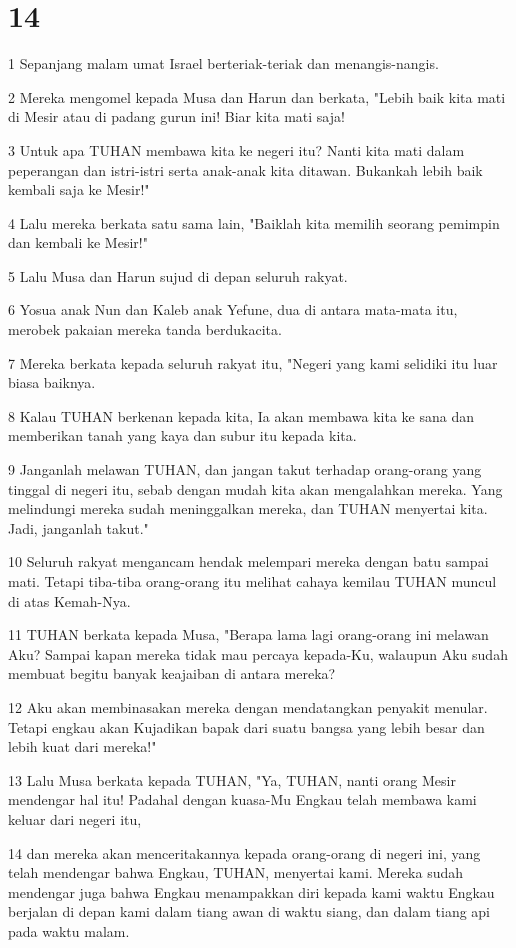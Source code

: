 \chapter{14}

\par 1 Sepanjang malam umat Israel berteriak-teriak dan menangis-nangis.
\par 2 Mereka mengomel kepada Musa dan Harun dan berkata, "Lebih baik kita mati di Mesir atau di padang gurun ini! Biar kita mati saja!
\par 3 Untuk apa TUHAN membawa kita ke negeri itu? Nanti kita mati dalam peperangan dan istri-istri serta anak-anak kita ditawan. Bukankah lebih baik kembali saja ke Mesir!"
\par 4 Lalu mereka berkata satu sama lain, "Baiklah kita memilih seorang pemimpin dan kembali ke Mesir!"
\par 5 Lalu Musa dan Harun sujud di depan seluruh rakyat.
\par 6 Yosua anak Nun dan Kaleb anak Yefune, dua di antara mata-mata itu, merobek pakaian mereka tanda berdukacita.
\par 7 Mereka berkata kepada seluruh rakyat itu, "Negeri yang kami selidiki itu luar biasa baiknya.
\par 8 Kalau TUHAN berkenan kepada kita, Ia akan membawa kita ke sana dan memberikan tanah yang kaya dan subur itu kepada kita.
\par 9 Janganlah melawan TUHAN, dan jangan takut terhadap orang-orang yang tinggal di negeri itu, sebab dengan mudah kita akan mengalahkan mereka. Yang melindungi mereka sudah meninggalkan mereka, dan TUHAN menyertai kita. Jadi, janganlah takut."
\par 10 Seluruh rakyat mengancam hendak melempari mereka dengan batu sampai mati. Tetapi tiba-tiba orang-orang itu melihat cahaya kemilau TUHAN muncul di atas Kemah-Nya.
\par 11 TUHAN berkata kepada Musa, "Berapa lama lagi orang-orang ini melawan Aku? Sampai kapan mereka tidak mau percaya kepada-Ku, walaupun Aku sudah membuat begitu banyak keajaiban di antara mereka?
\par 12 Aku akan membinasakan mereka dengan mendatangkan penyakit menular. Tetapi engkau akan Kujadikan bapak dari suatu bangsa yang lebih besar dan lebih kuat dari mereka!"
\par 13 Lalu Musa berkata kepada TUHAN, "Ya, TUHAN, nanti orang Mesir mendengar hal itu! Padahal dengan kuasa-Mu Engkau telah membawa kami keluar dari negeri itu,
\par 14 dan mereka akan menceritakannya kepada orang-orang di negeri ini, yang telah mendengar bahwa Engkau, TUHAN, menyertai kami. Mereka sudah mendengar juga bahwa Engkau menampakkan diri kepada kami waktu Engkau berjalan di depan kami dalam tiang awan di waktu siang, dan dalam tiang api pada waktu malam.
